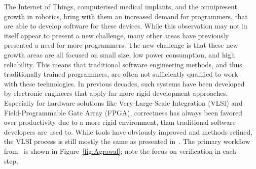 The Internet of Things, computerised medical implants, and the omnipresent growth in robotics, bring with them an increased demand for programmers, that are able to develop software for these devices. While this observation may not in itself appear to present a new challenge, many other areas have previously presented a need for more programmers. The new challenge is that these new growth areas are all focused on small size, low power consumption, and high reliability. This means that traditional software engineering methods, and thus traditionally trained programmers, are often not sufficiently qualified to work with these technologies.
In previous decades, such systems have been developed by electronic engineers that apply far more rigid development approaches. Especially for hardware solutions like Very-Large-Scale Integration (VLSI) and Field-Programmable Gate Array (FPGA), correctness has always been favored over productivity due to a more rigid environment, than traditional software developers are used to.
While tools have obviously improved and methods refined, the VLSI process is still mostly the same as presented in~\cite{Agrawal:1985:VDP:320599.322570}. The primary workflow from~\cite{Agrawal:1985:VDP:320599.322570} is shown in Figure~\ref{fig:Agrawal}; note the focus on verification in each step.

